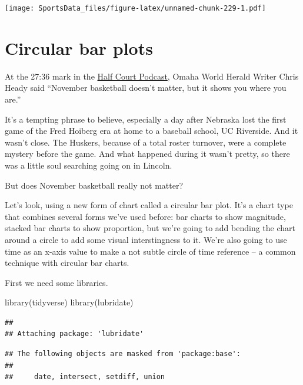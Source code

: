 \documentclass[
]{book}
\newenvironment{Shaded}{\begin{snugshade}}{\end{snugshade}}
\newcommand{\FunctionTok}[1]{\textcolor[rgb]{0.00,0.00,0.00}{#1}}
\newcommand{\NormalTok}[1]{#1}
\begin{document}
\texttt{[image: SportsData\_files/figure-latex/unnamed-chunk-229-1.pdf]}

\hypertarget{circular-bar-plots}{%
\chapter{Circular bar plots}\label{circular-bar-plots}}

At the 27:36 mark in the \href{https://www.omaha.com/sports/podcasts/half-court-press/half-court-press-creighton-cruises-in-opener-nebraska-stunned-in/article_67081a35-3a8f-5e9e-ae67-e88fcacbb362.html}{Half Court Podcast}, Omaha World Herald Writer Chris Heady said ``November basketball doesn't matter, but it shows you where you are.''

It's a tempting phrase to believe, especially a day after Nebraska lost the first game of the Fred Hoiberg era at home to a baseball school, UC Riverside. And it wasn't close. The Huskers, because of a total roster turnover, were a complete mystery before the game. And what happened during it wasn't pretty, so there was a little soul searching going on in Lincoln.

But does November basketball really not matter?

Let's look, using a new form of chart called a circular bar plot. It's a chart type that combines several forms we've used before: bar charts to show magnitude, stacked bar charts to show proportion, but we're going to add bending the chart around a circle to add some visual interstingness to it. We're also going to use time as an x-axis value to make a not subtle circle of time reference -- a common technique with circular bar charts.

First we need some libraries.

\begin{Shaded}
\begin{Highlighting}[]
\FunctionTok{library}\NormalTok{(tidyverse)}
\FunctionTok{library}\NormalTok{(lubridate)}
\end{Highlighting}
\end{Shaded}

\begin{verbatim}
## 
## Attaching package: 'lubridate'
\end{verbatim}

\begin{verbatim}
## The following objects are masked from 'package:base':
## 
##     date, intersect, setdiff, union
\end{verbatim}
\end{document}
